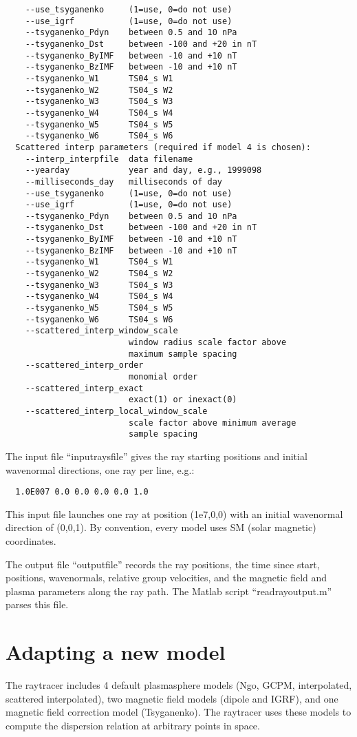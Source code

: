 \documentclass[10pt]{article}
\begin{document}
\begin{verbatim}
    --use_tsyganenko     (1=use, 0=do not use)
    --use_igrf           (1=use, 0=do not use)
    --tsyganenko_Pdyn    between 0.5 and 10 nPa
    --tsyganenko_Dst     between -100 and +20 in nT
    --tsyganenko_ByIMF   between -10 and +10 nT
    --tsyganenko_BzIMF   between -10 and +10 nT
    --tsyganenko_W1      TS04_s W1
    --tsyganenko_W2      TS04_s W2
    --tsyganenko_W3      TS04_s W3
    --tsyganenko_W4      TS04_s W4
    --tsyganenko_W5      TS04_s W5
    --tsyganenko_W6      TS04_s W6
  Scattered interp parameters (required if model 4 is chosen):
    --interp_interpfile  data filename
    --yearday            year and day, e.g., 1999098
    --milliseconds_day   milliseconds of day
    --use_tsyganenko     (1=use, 0=do not use)
    --use_igrf           (1=use, 0=do not use)
    --tsyganenko_Pdyn    between 0.5 and 10 nPa
    --tsyganenko_Dst     between -100 and +20 in nT
    --tsyganenko_ByIMF   between -10 and +10 nT
    --tsyganenko_BzIMF   between -10 and +10 nT
    --tsyganenko_W1      TS04_s W1
    --tsyganenko_W2      TS04_s W2
    --tsyganenko_W3      TS04_s W3
    --tsyganenko_W4      TS04_s W4
    --tsyganenko_W5      TS04_s W5
    --tsyganenko_W6      TS04_s W6
    --scattered_interp_window_scale
                         window radius scale factor above
                         maximum sample spacing
    --scattered_interp_order
                         monomial order
    --scattered_interp_exact
                         exact(1) or inexact(0)
    --scattered_interp_local_window_scale
                         scale factor above minimum average
                         sample spacing
\end{verbatim}

The input file ``inputraysfile'' gives the ray starting positions and
initial wavenormal directions, one ray per line, e.g.:
\begin{verbatim}
  1.0E007 0.0 0.0 0.0 0.0 1.0
\end{verbatim}
This input file launches one ray at position (1e7,0,0) with an initial
wavenormal direction of (0,0,1).  By convention, every model uses SM
(solar magnetic) coordinates.

The output file ``outputfile'' records the ray positions, the time
since start, positions, wavenormals, relative group velocities, and
the magnetic field and plasma parameters along the ray path.  The
Matlab script ``readrayoutput.m'' parses this file.

\section{Adapting a new model}
The raytracer includes 4 default plasmasphere models (Ngo, GCPM,
interpolated, scattered interpolated), two magnetic field models
(dipole and IGRF), and one magnetic field correction model
(Tsyganenko).  The raytracer uses these models to compute the
dispersion relation at arbitrary points in space.
\end{document}
